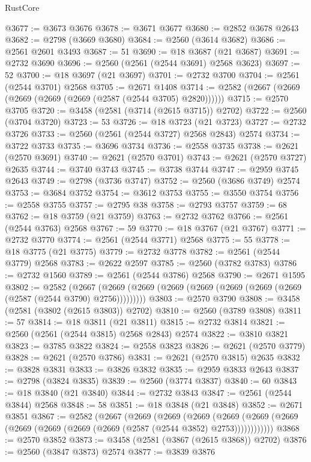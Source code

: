\begin{lexlean}{RustCore}
\begin{coremodule}
@3677 := @3673 @3676
@3678 := @3671 @3677
@3680 := @2852 @3678 @2643
@3682 := @2798 (@3669 @3680)
@3684 := @2560 (@3614 @3682)
@3686 := @2561 @2601 @3493
@3687 := 51
@3690 := @18 @3687 (@21 @3687)
@3691 := @2732 @3690
@3696 := @2560 (@2561 (@2544 @3691) @2568 @3623)
@3697 := 52
@3700 := @18 @3697 (@21 @3697)
@3701 := @2732 @3700
@3704 := @2561 (@2544 @3701) @2568
@3705 := @2671 @1408
@3714 := @2582 (@2667 (@2669 (@2669 (@2669 (@2669 (@2587 (@2544 @3705) @2820))))))
@3715 := @2570 @3705
@3720 := @3458 (@2581 (@3714 (@2615 @3715)) @2702)
@3722 := @2560 (@3704 @3720)
@3723 := 53
@3726 := @18 @3723 (@21 @3723)
@3727 := @2732 @3726
@3733 := @2560 (@2561 (@2544 @3727) @2568 @2843) @2574
@3734 := @3722 @3733
@3735 := @3696 @3734
@3736 := @2558 @3735
@3738 := @2621 (@2570 @3691)
@3740 := @2621 (@2570 @3701)
@3743 := @2621 (@2570 @3727) @2635
@3744 := @3740 @3743
@3745 := @3738 @3744
@3747 := @2959 @3745 @2643
@3749 := @2798 (@3736 @3747)
@3752 := @2560 (@3686 @3749) @2574
@3753 := @3684 @3752
@3754 := @3612 @3753
@3755 := @3550 @3754
@3756 := @2558 @3755
@3757 := @2795 @38
@3758 := @2793 @3757
@3759 := 68
@3762 := @18 @3759 (@21 @3759)
@3763 := @2732 @3762
@3766 := @2561 (@2544 @3763) @2568
@3767 := 59
@3770 := @18 @3767 (@21 @3767)
@3771 := @2732 @3770
@3774 := @2561 (@2544 @3771) @2568
@3775 := 55
@3778 := @18 @3775 (@21 @3775)
@3779 := @2732 @3778
@3782 := @2561 (@2544 @3779) @2568
@3783 := @2622 @2597
@3785 := @2560 (@3782 @3783)
@3786 := @2732 @1560
@3789 := @2561 (@2544 @3786) @2568
@3790 := @2671 @1595
@3802 := @2582
    (@2667 (@2669 (@2669 (@2669 (@2669 (@2669 (@2669 (@2669 (@2587 (@2544 @3790) @2756)))))))))
@3803 := @2570 @3790
@3808 := @3458 (@2581 (@3802 (@2615 @3803)) @2702)
@3810 := @2560 (@3789 @3808)
@3811 := 57
@3814 := @18 @3811 (@21 @3811)
@3815 := @2732 @3814
@3821 := @2560 (@2561 (@2544 @3815) @2568 @2843) @2574
@3822 := @3810 @3821
@3823 := @3785 @3822
@3824 := @2558 @3823
@3826 := @2621 (@2570 @3779)
@3828 := @2621 (@2570 @3786)
@3831 := @2621 (@2570 @3815) @2635
@3832 := @3828 @3831
@3833 := @3826 @3832
@3835 := @2959 @3833 @2643
@3837 := @2798 (@3824 @3835)
@3839 := @2560 (@3774 @3837)
@3840 := 60
@3843 := @18 @3840 (@21 @3840)
@3844 := @2732 @3843
@3847 := @2561 (@2544 @3844) @2568
@3848 := 58
@3851 := @18 @3848 (@21 @3848)
@3852 := @2671 @3851
@3867 := @2582
    (@2667
      (@2669
        (@2669
          (@2669
            (@2669 (@2669 (@2669 (@2669 (@2669 (@2669 (@2669 (@2587 (@2544 @3852) @2753))))))))))))
@3868 := @2570 @3852
@3873 := @3458 (@2581 (@3867 (@2615 @3868)) @2702)
@3876 := @2560 (@3847 @3873) @2574
@3877 := @3839 @3876

\end{coremodule}
\end{lexlean}
